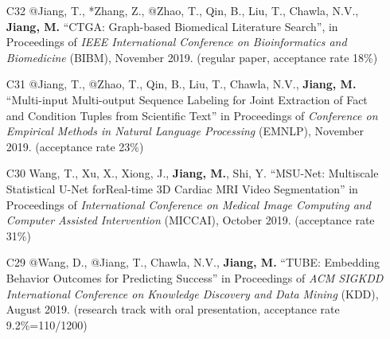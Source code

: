 \documentclass[10pt]{article}
\newenvironment{myindentpar}[1]%
{\begin{list}{}%
         {\setlength{\leftmargin}{#1}}%
         \item[]%
}
{\end{list}}
\newcounter{list}
\newcommand{\hide}[1]{}
\begin{document}
\begin{myindentpar}{0.00cm}
\begin{enumerate}[leftmargin=.5cm]
\item[C32] @Jiang, T., *Zhang, Z., @Zhao, T., Qin, B., Liu, T., Chawla, N.V., \textbf{Jiang, M.} ``CTGA: Graph-based Biomedical Literature Search'', in Proceedings of \textit{IEEE International Conference on Bioinformatics and Biomedicine} (BIBM), November 2019. (regular paper, acceptance rate 18\%)

	\hide{\vspace{-0.1cm}\hspace{0.5cm}{\small \emph{I made 20\% contribution and Mr. Jiang made 60\%. I conceived the idea. Mr. Jiang implemented the system, did the experiments, and wrote the paper.}}}

\item[C31] @Jiang, T., @Zhao, T., Qin, B., Liu, T., Chawla, N.V., \textbf{Jiang, M.} ``Multi-input Multi-output Sequence Labeling for Joint Extraction of Fact and Condition Tuples from Scientific Text'' in Proceedings of \textit{Conference on Empirical Methods in Natural Language Processing} (EMNLP), November 2019. (acceptance rate 23\%)

	\hide{\vspace{-0.1cm}\hspace{0.5cm}{\small \emph{I made 30\% contribution and Mr. Jiang made 60\%. I conceived the idea. Mr. Jiang designed the study, implemented the system, and did the experiments. I wrote the introduction. Mr. Jiang wrote the rest of the paper.}}}

\item[C30] Wang, T., Xu, X., Xiong, J., \textbf{Jiang, M.}, Shi, Y. ``MSU-Net: Multiscale Statistical U-Net forReal-time 3D Cardiac MRI Video Segmentation'' in Proceedings of \textit{International Conference on Medical Image Computing and Computer Assisted Intervention} (MICCAI), October 2019. (acceptance rate 31\%)		
	\hide{\vspace{-0.1cm}\hspace{0.5cm}{\small \emph{I made 5\% contribution. I joined the discussions, re-wrote the introduction section, and reviewed the rest of the paper.}}}

\item[C29] @Wang, D., @Jiang, T., Chawla, N.V., \textbf{Jiang, M.} ``TUBE: Embedding Behavior Outcomes for Predicting Success'' in Proceedings of \emph{ACM SIGKDD International Conference on Knowledge Discovery and Data Mining} (KDD), August 2019. (research track with oral presentation, acceptance rate 9.2\%=110/1200)

	\hide{\vspace{-0.1cm}\hspace{0.5cm}{\small \emph{I made 30\% contribution and Mr. Wang made 60\%. I conceived the idea. Mr. Wang designed the study, implemented the system, and did the experiments. I wrote the introduction and part of method sections. Mr. Wang wrote the rest of the paper.}}}


\end{enumerate}
\end{myindentpar}
\end{document}
